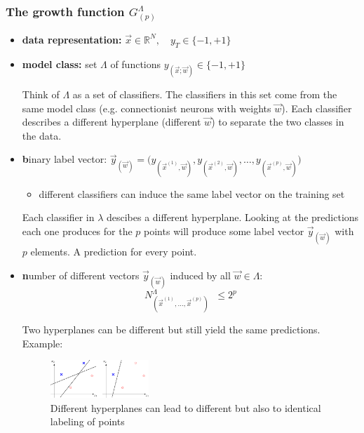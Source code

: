 \begin{frame} \frametitle{The growth function $G_{(p)}^\Lambda$}
	\begin{itemize}
		\item<1-> \textbf{data representation:} 
			$\vec{x} \in \mathbb{R}^N, \quad y_T \in \{-1,+1\}$ 
		\vspace{5mm}
		\item<1-> \textbf{model class:} 
			set $\Lambda$ of functions $y_{(\vec{x}; \vec{w})} \in \{-1,+1\}$
			
			Think of $\Lambda$ as a set of classifiers.
			The classifiers in this set come from the same model class (e.g. connectionist neurons with weights $\vec w$).
			Each classifier describes a different hyperplane (different $\vec w$) to separate the two classes in the data.
			
		\vspace{5mm}
		\item<2-> {\textbf binary label vector:} $\vec y_{(\vec{w})} = \Big( 
			y_{(\vec{x}^{(1)}, \vec{w})}, 
			y_{(\vec{x}^{(2)}, \vec{w})}, \ldots, 
			y_{(\vec{x}^{(p)}, \vec{w})} \Big)$
			\begin{itemize}	
				\item different classifiers can induce the 
					same label vector on the training set 
			\end{itemize}
			
			Each classifier in $\lambda$ descibes a different hyperplane.
			Looking at the predictions each one produces for the $p$ points will produce some label vector $\vec y_{(\vec{w})}$ with $p$ elements. A prediction for every point.
			
		\vspace{5mm}
		\item<3> {\textbf number} of different vectors $\vec y_{(\vec{w})}$ 
			induced by all $\vec w \in \Lambda$:
			\vspace{-2mm}
			\begin{equation}
				\tag{depends on $\Lambda$ and the sample}
				N_{(\vec{x}^{(1)}, \ldots, \vec{x}^{(p)})}^\Lambda 
				\;\;\leq 2^p 
			\end{equation}
			
		Two hyperplanes can be different but still yield the same predictions.
		Example:\\
		\begin{figure}[h]
			\centering
			\includegraphics[width=0.35\textwidth]{img/uniquepredictions}
			\caption{Different hyperplanes can lead to different but also to identical labeling of points}
		\end{figure}
		

\end{itemize}
\end{frame}
